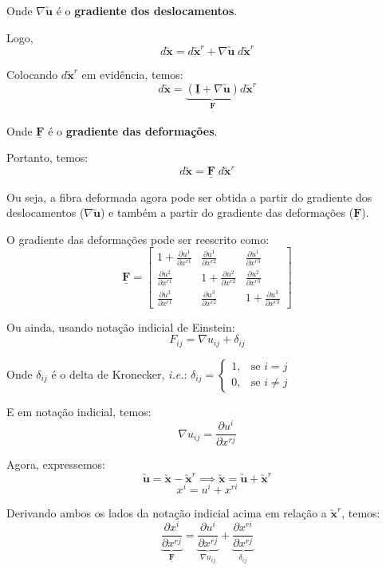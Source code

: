 	Onde $\nabla\utilde{\mathbf{u}}$ é o \textbf{gradiente dos deslocamentos}.
	
	Logo,
	\[d\utilde{\mathbf{x}}=d\utilde{\mathbf{x}}^r+\nabla\utilde{\mathbf{u}}\;d\utilde{\mathbf{x}}^r\]
	
	Colocando $d\utilde{\mathbf{x}}^r$ em evidência, temos:
	\[d\utilde{\mathbf{x}}=\underbrace{(\underline{\mathbf{I}}+\nabla\utilde{\mathbf{u}})}_{\displaystyle \underline{\mathbf{F}}}d\utilde{\mathbf{x}}^r\]
	
	Onde $\underline{\mathbf{F}}$ é o \textbf{gradiente das deformações}.
	
	Portanto, temos:
	\begin{equation}
	d\utilde{\mathbf{x}}=\underline{\mathbf{F}}\;d\utilde{\mathbf{x}}^r
	\end{equation}
	
	Ou seja, a fibra deformada agora pode ser obtida a partir do gradiente dos deslocamentos ($\nabla\utilde{\mathbf{u}}$) e também a partir do gradiente das deformações ($\underline{\mathbf{F}}$).
	
	O gradiente das deformações pode ser reescrito como:
	\[
	\underline{\mathbf{F}}=
	\begin{bmatrix}
		1+\frac{\partial u^1}{\partial x^{r1}} & \frac{\partial u^1}{\partial x^{r2}} & \frac{\partial u^1}{\partial x^{r3}} \\
		\frac{\partial u^2}{\partial x^{r1}} & 1+\frac{\partial u^2}{\partial x^{r2}} & \frac{\partial u^2}{\partial x^{r3}} \\
		\frac{\partial u^3}{\partial x^{r1}} & \frac{\partial u^3}{\partial x^{r2}} & 1+\frac{\partial u^3}{\partial x^{r3}}
	\end{bmatrix}
	\]
	
	Ou ainda, usando notação indicial de Einstein:
	\[F_{ij}=\nabla u_{ij}+\delta_{ij}\]
	
	Onde $\delta_{ij}$ é o delta de Kronecker, \textit{i.e.}: $\delta_{ij}=\begin{cases} 1, & \text{se } i=j \\ 0, & \text{se } i\neq j \end{cases}$
	
	E em notação indicial, temos:
	\[\nabla u_{ij}=\frac{\partial u^i}{\partial x^{rj}}\]
	
	Agora, expressemos:
	\[\utilde{\mathbf{u}}=\utilde{\mathbf{x}}-\utilde{\mathbf{x}}^r\implies \utilde{\mathbf{x}}=\utilde{\mathbf{u}}+\utilde{\mathbf{x}}^r\]
	\[x^i=u^i+x^{ri}\]
	
	Derivando ambos os lados da notação indicial acima em relação a $\utilde{\mathbf{x}}^r$, temos:
	\[\underbrace{\frac{\partial x^i}{\partial x^{rj}}}_{\displaystyle\underline{\mathbf{F}}}=\underbrace{\frac{\partial u^i}{\partial x^{rj}}}_{\displaystyle\nabla u_{ij}}+\underbrace{\frac{\partial x^{ri}}{\partial x^{rj}}}_{\displaystyle\delta_{ij}}\]
	
